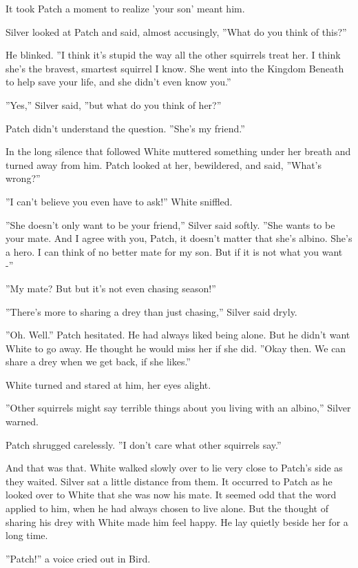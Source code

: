 \documentclass[11pt]{article}
\begin{document}
 It took Patch a moment to realize 'your son' meant him.\par
 Silver looked at Patch and said, almost accusingly, ''What do you think of this?''\par
 He blinked. ''I think it's stupid the way all the other squirrels treat her. I think she's the bravest, smartest squirrel I know. She went into the Kingdom Beneath to help save your life, and she didn't even know you.''\par
 ''Yes,'' Silver said, ''but what do you think of her?''\par
 Patch didn't understand the question. ''She's my friend.''\par
 In the long silence that followed White muttered something under her breath and turned away from him. Patch looked at her, bewildered, and said, ''What's wrong?''\par
 ''I can't believe you even have to ask!'' White sniffled.\par
 ''She doesn't only want to be your friend,'' Silver said softly. ''She wants to be your mate. And I agree with you, Patch, it doesn't matter that she's albino. She's a hero. I can think of no better mate for my son. But if it is not what you want -''\par
 ''My mate? But %
 but it's not even chasing season!''\par
 ''There's more to sharing a drey than just chasing,'' Silver said dryly.\par
 ''Oh. Well.'' Patch hesitated. He had always liked being alone. But he didn't want White to go away. He thought he would miss her if she did. ''Okay then. We can share a drey when we get back, if she likes.''\par
 White turned and stared at him, her eyes alight.\par
 ''Other squirrels might say terrible things about you living with an albino,'' Silver warned.\par
 Patch shrugged carelessly. ''I don't care what other squirrels say.''\par
 And that was that. White walked slowly over to lie very close to Patch's side as they waited. Silver sat a little distance from them. It occurred to Patch as he looked over to White that she was now his mate. It seemed odd that the word applied to him, when he had always chosen to live alone. But the thought of sharing his drey with White made him feel happy. He lay quietly beside her for a long time.\par
 ''Patch!'' a voice cried out in Bird.\par
\end{document}
